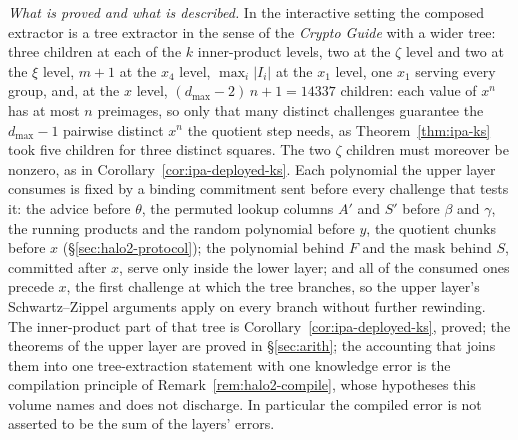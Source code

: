 \documentclass[11pt,a4paper]{article}
\theoremstyle{definition}
\begin{document}
\emph{What is proved and what is described.} In the interactive setting
the composed extractor is a tree extractor in the sense of the
\emph{Crypto Guide} with a wider tree: three children at each of the $k$
inner-product levels, two at the $\zeta$ level and two at the $\xi$
level, $m + 1$ at the $x_4$ level, $\max_i |I_i|$ at the $x_1$ level,
one $x_1$ serving every group, and, at the $x$ level,
$(d_{\max} - 2)\,n + 1 = 14337$ children: each value of $x^{n}$ has at
most $n$ preimages, so only that many distinct challenges guarantee the
$d_{\max} - 1$ pairwise distinct $x^{n}$ the quotient step needs, as
Theorem~\ref{thm:ipa-ks} took five children for three distinct squares.
The two $\zeta$ children must moreover be nonzero, as in
Corollary~\ref{cor:ipa-deployed-ks}. Each
polynomial the upper layer consumes is fixed by a binding commitment sent
before every challenge that tests it: the advice
before $\theta$, the permuted lookup columns $A'$ and $S'$ before
$\beta$ and $\gamma$, the running products and the random polynomial
before $y$, the quotient chunks before $x$ (\S\ref{sec:halo2-protocol});
the polynomial behind $F$ and the mask behind $S$, committed after $x$,
serve only inside the lower layer; and all of the consumed ones precede
$x$, the first challenge at which the tree
branches, so the upper layer's Schwartz--Zippel arguments apply on every
branch without further rewinding. The inner-product part of that tree is
Corollary~\ref{cor:ipa-deployed-ks}, proved; the theorems of the upper
layer are proved in \S\ref{sec:arith}; the accounting that joins them
into one tree-extraction statement with one knowledge error is the
compilation principle of Remark~\ref{rem:halo2-compile}, whose
hypotheses this volume names and does not discharge. In particular the
compiled error is not asserted to be the sum of the layers' errors.
\end{document}
